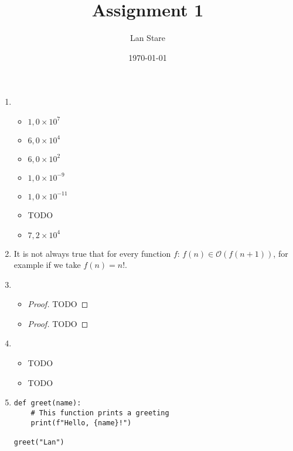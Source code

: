 \documentclass[12pt]{article}
\begin{document}
\title{Assignment 1}
\author{Lan Stare}
\date{\today}
\maketitle

\section*{}
\begin{enumerate}
    \item 
        \begin{itemize}
            \item $1,0 \times 10^{7}$
            \item $6,0 \times 10^{4}$
            \item $6,0 \times 10^{2}$
            \item $1,0 \times 10^{-9}$
            \item $1,0 \times 10^{-11}$
            \item TODO
            \item $7,2 \times 10^{4}$
        \end{itemize}
    \item It is not always true that for every function $f$: $f(n) \in \mathcal{O}(f(n + 1))$, for example if we take $f(n) = n!$.
    \item 
        \begin{itemize}
            \item 
            \begin{proof}
                TODO
            \end{proof}
            \item 
            \begin{proof}
                TODO
            \end{proof}
        \end{itemize}
    \item 
        \begin{itemize}
            \item TODO
            \item TODO
        \end{itemize}
    \item
        \begin{lstlisting}
def greet(name):
    # This function prints a greeting
    print(f"Hello, {name}!")

greet("Lan")
\end{lstlisting}
\end{enumerate}
\end{document}
